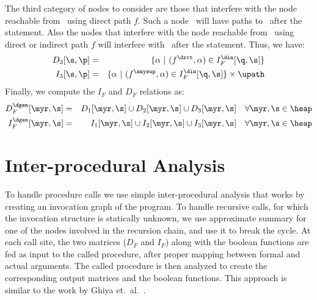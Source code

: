 \begin{enumerate}
The third category of nodes to consider are those that
interfere with the node reachable from \q\ using direct path
$f$. Such a node \s\ will have paths to \p\ after the
statement. Also the nodes that interfere with the node reachable from \q\ using direct or indirect path
$f$ will interfere with \p\ after the statement. Thus, we have:
\begin{eqnarray*}
  D_3[\s, \p] &=& \{ \alpha \ \vert \ (f^{\drct}, \alpha) \in I_F^{\din}[\q, \s] \}  \\
  I_3[\s, \p] &=& \{\alpha \ \vert\ (f^\anysup, \alpha) \in I_F^{\din}[\q, \s]\} \times \upath 
\end{eqnarray*}
Finally, we compute the $I_F$ and $D_F$ relations as:
\begin{eqnarray*}
D_F^{\dgen}[\myr, \s] &= & D_1[\myr, \s] \cup D_2[\myr, \s] \cup D_3[\myr, \s] \quad \forall\myr,\s \in \heap  \\
I_F^{\dgen}[\myr, \s] &= & I_1[\myr, \s] \cup I_2[\myr, \s] \cup I_3[\myr, \s] \quad \forall\myr,\s \in \heap 
\end{eqnarray*}
\end{enumerate}

\section{Inter-procedural Analysis} \label{Interprocedural_Analysis}
To handle procedure calls we use simple inter-procedural
analysis that works by creating an invocation graph of the
program. To handle recursive calls, for which the invocation
structure is statically unknown, we use approximate summary
for one of the nodes involved in the recursion chain, and use
it to break the cycle. At each call site, the two matrices
($D_F$ and $I_F$) along with the boolean functions are fed as
input to the called procedure, after proper mapping between
formal and actual arguments. The called procedure is then
analyzed to create the corresponding output matrices and the
boolean functions. This approach is similar to the work by
Ghiya et.~al.~\cite{Ghiya96}.
